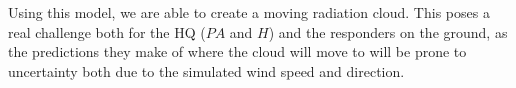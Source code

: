 Using this model, we are able to create a moving radiation cloud. This poses a real challenge both for the HQ ($PA$ and $H$) and the responders on the ground, as the predictions they make of where the cloud will move to will be prone to uncertainty both due to the simulated wind speed and direction. 


%
